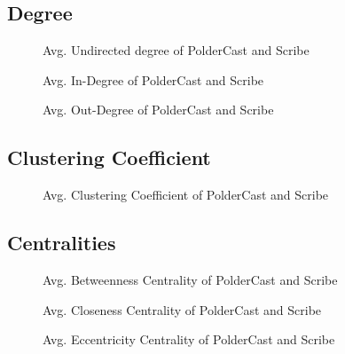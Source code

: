 \subsection{Degree}

\begin{figure}[H]
    \centering
    
    \caption{Avg. Undirected degree of PolderCast and Scribe}
    \label{fig:eval_degree}
\end{figure}

\begin{figure}[H]
    \centering
    
    \caption{Avg. In-Degree of PolderCast and Scribe}
    \label{fig:eval_indegree}
\end{figure}

\begin{figure}[H]
    \centering
    
    \caption{Avg. Out-Degree of PolderCast and Scribe}
    \label{fig:eval_outdegree}
\end{figure}

\subsection{Clustering Coefficient}
\begin{figure}[H]
    \centering
    
    \caption{Avg. Clustering Coefficient of PolderCast and Scribe}
    \label{fig:eval_cc}
\end{figure}

\subsection{Centralities}

\begin{figure}[H]
    \centering
    
    \caption{Avg. Betweenness Centrality of PolderCast and Scribe}
    \label{fig:eval_betweenness}
\end{figure}

\begin{figure}[H]
    \centering
    
    \caption{Avg. Closeness Centrality of PolderCast and Scribe}
    \label{fig:eval_closeness}
\end{figure}

\begin{figure}[H]
    \centering
    
    \caption{Avg. Eccentricity Centrality of PolderCast and Scribe}
    \label{fig:eval_eccentricity}
\end{figure}
